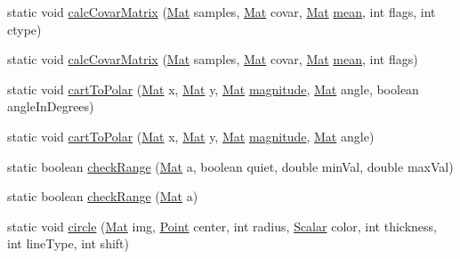 \begin{DoxyCompactItemize}
static void \mbox{\hyperlink{classorg_1_1opencv_1_1core_1_1_core_afebca901f30f80a2a6db7a67cc2afb0a}{calc\+Covar\+Matrix}} (\mbox{\hyperlink{classorg_1_1opencv_1_1core_1_1_mat}{Mat}} samples, \mbox{\hyperlink{classorg_1_1opencv_1_1core_1_1_mat}{Mat}} covar, \mbox{\hyperlink{classorg_1_1opencv_1_1core_1_1_mat}{Mat}} \mbox{\hyperlink{classorg_1_1opencv_1_1core_1_1_core_aff700e66b1cef1a74cfd94d405369edf}{mean}}, int flags, int ctype)
\item 
static void \mbox{\hyperlink{classorg_1_1opencv_1_1core_1_1_core_ac9a38bf2bcad4daa87e017dceb927bc3}{calc\+Covar\+Matrix}} (\mbox{\hyperlink{classorg_1_1opencv_1_1core_1_1_mat}{Mat}} samples, \mbox{\hyperlink{classorg_1_1opencv_1_1core_1_1_mat}{Mat}} covar, \mbox{\hyperlink{classorg_1_1opencv_1_1core_1_1_mat}{Mat}} \mbox{\hyperlink{classorg_1_1opencv_1_1core_1_1_core_aff700e66b1cef1a74cfd94d405369edf}{mean}}, int flags)
\item 
static void \mbox{\hyperlink{classorg_1_1opencv_1_1core_1_1_core_a395a53b9bd769978c12c2c19a02ffeae}{cart\+To\+Polar}} (\mbox{\hyperlink{classorg_1_1opencv_1_1core_1_1_mat}{Mat}} x, \mbox{\hyperlink{classorg_1_1opencv_1_1core_1_1_mat}{Mat}} y, \mbox{\hyperlink{classorg_1_1opencv_1_1core_1_1_mat}{Mat}} \mbox{\hyperlink{classorg_1_1opencv_1_1core_1_1_core_ac0195922fb03d6bad195054e615cb4e1}{magnitude}}, \mbox{\hyperlink{classorg_1_1opencv_1_1core_1_1_mat}{Mat}} angle, boolean angle\+In\+Degrees)
\item 
static void \mbox{\hyperlink{classorg_1_1opencv_1_1core_1_1_core_a6bb86bd8157b4d8561b29e288445a6c9}{cart\+To\+Polar}} (\mbox{\hyperlink{classorg_1_1opencv_1_1core_1_1_mat}{Mat}} x, \mbox{\hyperlink{classorg_1_1opencv_1_1core_1_1_mat}{Mat}} y, \mbox{\hyperlink{classorg_1_1opencv_1_1core_1_1_mat}{Mat}} \mbox{\hyperlink{classorg_1_1opencv_1_1core_1_1_core_ac0195922fb03d6bad195054e615cb4e1}{magnitude}}, \mbox{\hyperlink{classorg_1_1opencv_1_1core_1_1_mat}{Mat}} angle)
\item 
static boolean \mbox{\hyperlink{classorg_1_1opencv_1_1core_1_1_core_a2260f7346beb98771f860e39e4b4a924}{check\+Range}} (\mbox{\hyperlink{classorg_1_1opencv_1_1core_1_1_mat}{Mat}} a, boolean quiet, double min\+Val, double max\+Val)
\item 
static boolean \mbox{\hyperlink{classorg_1_1opencv_1_1core_1_1_core_a5eca29b5a4b3eb63f1a549970847dfcd}{check\+Range}} (\mbox{\hyperlink{classorg_1_1opencv_1_1core_1_1_mat}{Mat}} a)
\item 
static void \mbox{\hyperlink{classorg_1_1opencv_1_1core_1_1_core_aa0f688f66d937f5952cb9f1db6f43326}{circle}} (\mbox{\hyperlink{classorg_1_1opencv_1_1core_1_1_mat}{Mat}} img, \mbox{\hyperlink{classorg_1_1opencv_1_1core_1_1_point}{Point}} center, int radius, \mbox{\hyperlink{classorg_1_1opencv_1_1core_1_1_scalar}{Scalar}} color, int thickness, int line\+Type, int shift)

\end{DoxyCompactItemize}
